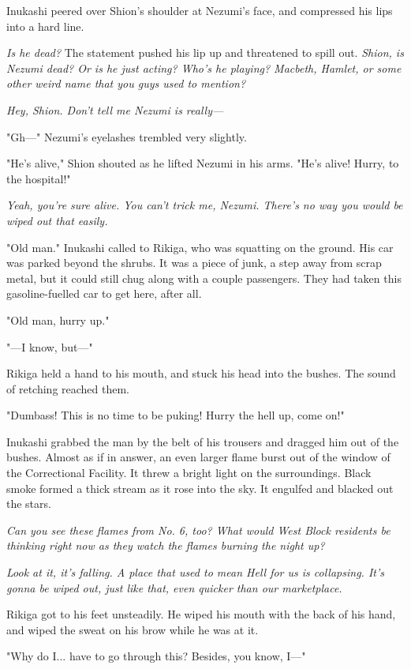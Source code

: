 Inukashi peered over Shion's shoulder at Nezumi's face, and compressed
his lips into a hard line.

\emph{Is he dead?} The statement pushed his lip up and threatened to spill out.
\emph{Shion, is Nezumi dead? Or is he just acting? Who's he playing? Macbeth,
Hamlet, or some other weird name that you guys used to mention?}

\emph{Hey, Shion. Don't tell me Nezumi is really---}

"Gh---" Nezumi's eyelashes trembled very slightly.

"He's alive," Shion shouted as he lifted Nezumi in his arms. "He's
alive! Hurry, to the hospital!"

\emph{Yeah, you're sure alive. You can't trick me, Nezumi. There's no way you
would be wiped out that easily.}

"Old man." Inukashi called to Rikiga, who was squatting on the ground.
His car was parked beyond the shrubs. It was a piece of junk, a step
away from scrap metal, but it could still chug along with a couple
passengers. They had taken this gasoline-fuelled car to get here, after
all.

"Old man, hurry up."

"---I know, but---"

Rikiga held a hand to his mouth, and stuck his head into the bushes. The
sound of retching reached them.

"Dumbass! This is no time to be puking! Hurry the hell up, come on!"

Inukashi grabbed the man by the belt of his trousers and dragged him out
of the bushes. Almost as if in answer, an even larger flame burst out of
the window of the Correctional Facility. It threw a bright light on the
surroundings. Black smoke formed a thick stream as it rose into the sky.
It engulfed and blacked out the stars.

\emph{Can you see these flames from No. 6, too? What would West Block
residents be thinking right now as they watch the flames burning the
night up?}

\emph{Look at it, it's falling. A place that used to mean Hell for us is
collapsing. It's gonna be wiped out, just like that, even quicker than
our marketplace.}

Rikiga got to his feet unsteadily. He wiped his mouth with the back of
his hand, and wiped the sweat on his brow while he was at it.

"Why do I... have to go through this? Besides, you know, I---"

